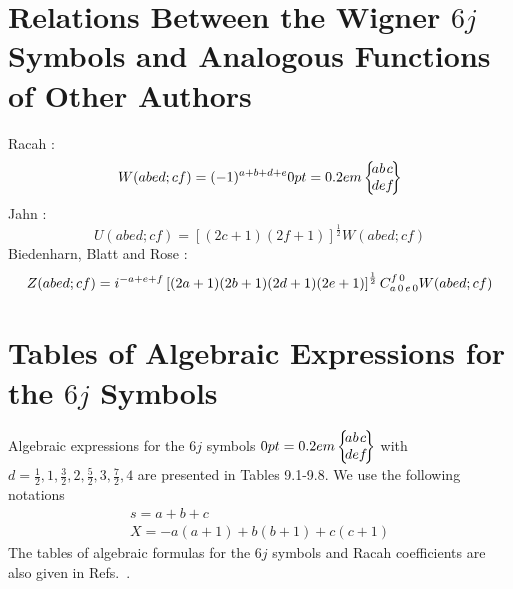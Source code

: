 \section{Relations Between the Wigner $6 j$ Symbols and Analogous Functions of Other Authors}\label{sec:9.10}
Racah \cite{ref091}:
\[
W(a b e d ; c f)=(-1)^{a+b+d+e}\sixj{a}{b}{c}{d}{e}{f}
\]
Jahn \cite{ref073}:
\[
U(a b e d ; c f)=[(2 c+1)(2 f+1)]^{\frac{1}{2}} W(a b e d ; c f)
\]
Biedenharn, Blatt and Rose \cite{ref056}:
\[
Z(a b e d ; c f)=i^{-a+e+f} \left[(2 a+1)(2 b+1)(2 d+1)(2 e+1)\right]^{\frac{1}{2}} C_{a\,0\,e\,0}^{f\,0} W(a b e d ; c f)
\]
\section{Tables of Algebraic Expressions for the $6 j$ Symbols}\label{sec:9.11}
Algebraic expressions for the $6 j$ symbols $\sixj{a}{b}{c}{d}{e}{f}$ with $d=\frac{1}{2}, 1, \frac{3}{2}, 2, \frac{5}{2}, 3, \frac{7}{2}, 4$ are presented in Tables 9.1-9.8. We use the following notations
\[
\begin{gathered}
s=a+b+c \\
X=-a(a+1)+b(b+1)+c(c+1)
\end{gathered}
\]
The tables of algebraic formulas for the $6 j$ symbols and Racah coefficients are also given in Refs.~\cite{ref003,ref045, ref056}.
